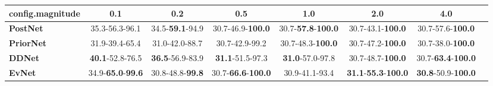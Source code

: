 \begin{tabular}{lccccccc}
\toprule
\textbf{config.magnitude} &                               0.1 &                      0.2 &                                0.5 &                                1.0 &                                         2.0 &                                4.0 \\
\midrule
\textbf{PostNet } &                    35.3-56.3-96.1 &  34.5-\textbf{59.1}-94.9 &           30.7-46.9-\textbf{100.0} &  30.7-\textbf{57.8}-\textbf{100.0} &                    30.7-43.1-\textbf{100.0} &           30.7-57.6-\textbf{100.0} \\
\textbf{PriorNet} &                    31.9-39.4-65.4 &           31.0-42.0-88.7 &                     30.7-42.9-99.2 &           30.7-48.3-\textbf{100.0} &                    30.7-47.2-\textbf{100.0} &           30.7-38.0-\textbf{100.0} \\
\textbf{DDNet   } &           \textbf{40.1}-52.8-76.5 &  \textbf{36.5}-56.9-83.9 &            \textbf{31.1}-51.5-97.3 &            \textbf{31.0}-57.0-97.8 &                    30.7-48.7-\textbf{100.0} &  30.7-\textbf{63.4}-\textbf{100.0} \\
\textbf{EvNet   } &  34.9-\textbf{65.0}-\textbf{99.6} &  30.8-48.8-\textbf{99.8} &  30.7-\textbf{66.6}-\textbf{100.0} &                     30.9-41.1-93.4 &  \textbf{31.1}-\textbf{55.3}-\textbf{100.0} &  \textbf{30.8}-50.9-\textbf{100.0} \\
\bottomrule
\end{tabular}
